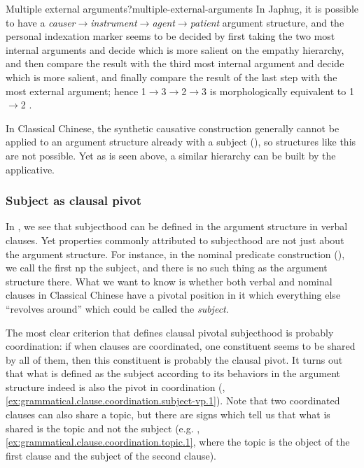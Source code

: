 \documentclass[UTF8, a4paper, oneside, scheme=plain, 12pt]{ctexrep}
\newcommand*{\textto}{$\to$}
\newcommand*{\citepage}[1]{p.~{#1}}
\newcommand*{\term}[1]{\emph{#1}}
\begin{document}
\begin{infobox}{Multiple external arguments?}{multiple-external-arguments}
    In Japhug, it is possible to have a \term{causer}\textto\term{instrument}\textto\term{agent}\textto\term{patient} argument structure,
    and the personal indexation marker seems to be decided by first taking the two most internal arguments and decide which is more salient on the empathy hierarchy,
    and then compare the result with the third most internal argument and decide which is more salient,
    and finally compare the result of the last step with the most external argument;
    hence 1\textto 3\textto 2\textto 3 is morphologically equivalent to 1\textto 2
    \citep[\citepage{310};\citepage{584},(116);\citepage{848},(67)]{jacques2021grammar}.
    
    In Classical Chinese, the synthetic causative construction 
    generally cannot be applied to an argument structure already with a subject (),
    so structures like this are not possible.
    Yet as is seen above, a similar hierarchy can be built by the applicative.
\end{infobox}

\subsubsection{Subject as clausal pivot}\label{sec:grammatical.verbal.subject.clause-pivot}

In ,
we see that subjecthood can be defined in the argument structure in verbal clauses.
Yet properties commonly attributed to subjecthood are not just about the argument structure.
For instance, in the nominal predicate construction (),
we call the first \ac{np} the subject,
and there is no such thing as the argument structure there.
What we want to know is whether both verbal and nominal clauses in Classical Chinese
have a pivotal position in it which everything else ``revolves around''
which could be called the \term{subject}.

The most clear criterion that defines clausal pivotal subjecthood is probably coordination:
if when clauses are coordinated,
one constituent seems to be shared by all of them,
then this constituent is probably the clausal pivot.
It turns out that what is defined as the subject according to its behaviors in the argument structure
indeed is also the pivot in coordination
(,
\ref{ex:grammatical.clause.coordination.subject-vp.1}).
Note that two coordinated clauses can also share a topic,
but there are signs which tell us that what is shared is the topic and not the subject
(e.g. , \ref{ex:grammatical.clause.coordination.topic.1}, where the topic is the object of the first clause and the subject of the second clause).
\end{document}
